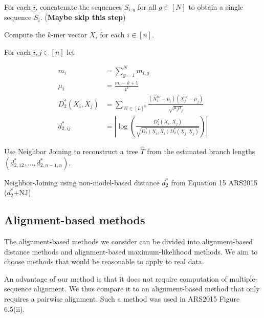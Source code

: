 \documentclass[12pt]{article}
\theoremstyle{definition}
\begin{document}
\begin{algorithm}[H]
 For each $i$, concatenate the sequences $S_{i,g}$ for all $g \in [N]$ to obtain a single sequence $S_{i}$. (\textbf{Maybe skip this step})

 Compute the $k$-mer vector $X_{i}$ for each $i \in [n]$.

 For each $i,j \in [n]$ let 

\begin{align*}
m_i &= \sum_{g=1}^N {m_{i,g}}\\
\mu_i &= \frac{m_i - k+1}{4^k}\\
 D_2^*(X_i,X_j) &= \sum_{W \in [L]^k} \frac{(X_i^W - \mu_i)(X_j^W-\mu_j)}{\sqrt{\mu_i \mu_j}}\\
d^*_{2,ij} &= \left| \log\left(\frac{D_2^*(X_i,X_j)}{\sqrt{D_2^*(X_i,X_i)D_2^*(X_j,X_j)}}\right) \right|
\end{align*}

            Use Neighbor Joining to reconstruct a tree $\hat{T}$ from the estimated branch lengths $(d^*_{2,12}, \ldots, d^*_{2,n-1,n})$.\;
            \caption{Neighbor-Joining using non-model-based distance $d^*_2$ from Equation 15 ARS2015 ($d^*_2$+NJ)}
 \label{algorithm:d2starNJ}
\end{algorithm}

\subsection{Alignment-based methods}

The alignment-based methods we consider can be divided into alignment-based distance methods and alignment-based maximum-likelihood methods. We aim to choose methods that would be reasonable to apply to real data.

An advantage of our method is that it does not require computation of multiple-sequence alignment. We thus compare it to an alignment-based method that only requires a pairwise alignment. Such a method was used in ARS2015 Figure 6.5(ii).
\end{document}
